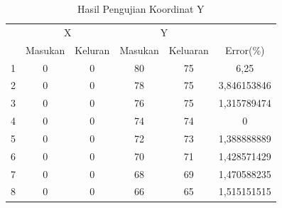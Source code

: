  \begin{table}[]
 	\centering
 	\caption{Hasil Pengujian Koordinat Y}
 	\label{tbl.koordinaty}
 	\begin{tabular}{|c|c|c|c|c|c|}
 		\hline
 		\rowcolor[HTML]{9B9B9B} 
 		\cellcolor[HTML]{9B9B9B}                     & \multicolumn{2}{c|}{\cellcolor[HTML]{9B9B9B}X} & \multicolumn{2}{c|}{\cellcolor[HTML]{9B9B9B}Y} & \cellcolor[HTML]{9B9B9B}                           \\ \cline{2-5}
 		\rowcolor[HTML]{9B9B9B} 
 		\multirow{-2}{*}{\cellcolor[HTML]{9B9B9B}No} & Masukan                & Keluran               & Masukan               & Keluaran               & \multirow{-2}{*}{\cellcolor[HTML]{9B9B9B}Error(\%)} \\ \hline
 			1                                            & 0                      & 0                     & 80                    & 75                     & 6,25                                               \\ \hline
 			2                                            & 0                      & 0                     & 78                    & 75                     & 3,846153846                                        \\ \hline
 			3                                            & 0                      & 0                     & 76                    & 75                     & 1,315789474                                        \\ \hline
 			4                                            & 0                      & 0                     & 74                    & 74                     & 0                                                  \\ \hline
 			5                                            & 0                      & 0                     & 72                    & 73                     & 1,388888889                                        \\ \hline
 			6                                            & 0                      & 0                     & 70                    & 71                     & 1,428571429                                        \\ \hline
 			7                                            & 0                      & 0                     & 68                    & 69                     & 1,470588235                                        \\ \hline
 			8                                            & 0                      & 0                     & 66                    & 65                     & 1,515151515                                        \\ \hline

\end{tabular}
\end{table}
